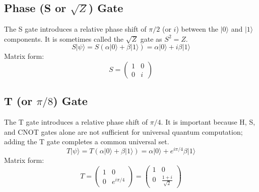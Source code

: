 \subsection*{Phase (S or $\sqrt{Z}$) Gate}
The S gate introduces a relative phase shift of $\pi/2$ (or $i$) between the $|0\rangle$ and $|1\rangle$ components. It is sometimes called the $\sqrt{Z}$ gate as $S^2 = Z$.
\begin{equation*}
    S|\psi\rangle = S(\alpha|0\rangle + \beta|1\rangle) = \alpha|0\rangle + i\beta|1\rangle
\end{equation*}
Matrix form:
\begin{equation*}
    S = \begin{pmatrix} 1 & 0 \\ 0 & i \end{pmatrix}
\end{equation*}

\subsection*{T (or $\pi/8$) Gate}
The T gate introduces a relative phase shift of $\pi/4$. It is important because H, S, and CNOT gates alone are not sufficient for universal quantum computation; adding the T gate completes a common universal set.
\begin{equation*}
    T|\psi\rangle = T(\alpha|0\rangle + \beta|1\rangle) = \alpha|0\rangle + e^{i\pi/4}\beta|1\rangle
\end{equation*}
Matrix form:
\begin{equation*}
    T = \begin{pmatrix} 1 & 0 \\ 0 & e^{i\pi/4} \end{pmatrix} = \begin{pmatrix} 1 & 0 \\ 0 & \frac{1+i}{\sqrt{2}} \end{pmatrix}
\end{equation*}


